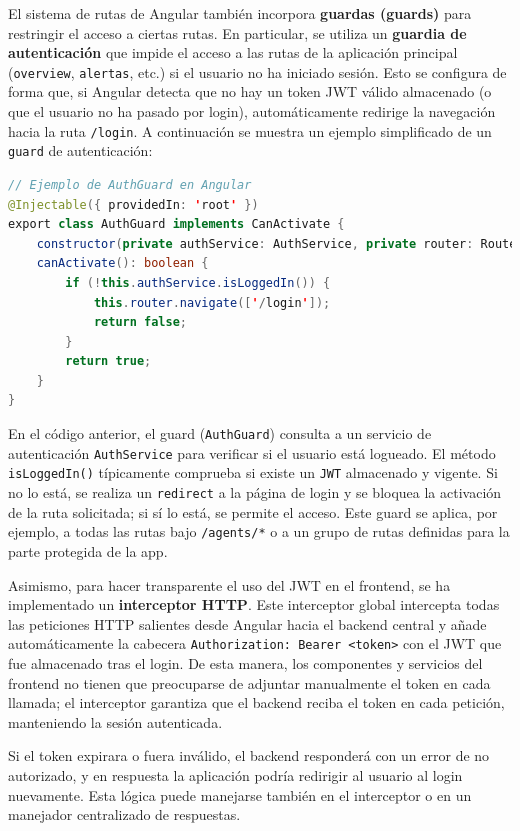 \documentclass[11pt,a4paper,twoside]{report}
\begin{document}
El sistema de rutas de Angular también incorpora \textbf{guardas (guards)} para restringir el acceso a ciertas rutas. En particular, se utiliza un \textbf{guardia de autenticación} que impide el acceso a las rutas de la aplicación principal (\texttt{overview}, \texttt{alertas}, etc.) si el usuario no ha iniciado sesión. Esto se configura de forma que, si Angular detecta que no hay un token JWT válido almacenado (o que el usuario no ha pasado por login), automáticamente redirige la navegación hacia la ruta \texttt{/login}. A continuación se muestra un ejemplo simplificado de un \texttt{guard} de autenticación:

\begin{lstlisting}[language=Java, caption={Ejemplo simplificado de authGuard}, label={lst:authGuard}]
// Ejemplo de AuthGuard en Angular
@Injectable({ providedIn: 'root' })
export class AuthGuard implements CanActivate {
	constructor(private authService: AuthService, private router: Router) {}
	canActivate(): boolean {
		if (!this.authService.isLoggedIn()) {
			this.router.navigate(['/login']);
			return false;
		}
		return true;
	}
}

\end{lstlisting}

En el código anterior, el guard (\texttt{AuthGuard}) consulta a un servicio de autenticación \texttt{AuthService} para verificar si el usuario está logueado. El método \texttt{isLoggedIn()} típicamente comprueba si existe un \texttt{JWT} almacenado y vigente. Si no lo está, se realiza un \texttt{redirect} a la página de login y se bloquea la activación de la ruta solicitada; si sí lo está, se permite el acceso. Este guard se aplica, por ejemplo, a todas las rutas bajo \texttt{/agents/*} o a un grupo de rutas definidas para la parte protegida de la app.\newline

Asimismo, para hacer transparente el uso del JWT en el frontend, se ha implementado un \textbf{interceptor HTTP}. Este interceptor global intercepta todas las peticiones HTTP salientes desde Angular hacia el backend central y añade automáticamente la cabecera \texttt{Authorization: Bearer <token>} con el JWT que fue almacenado tras el login. De esta manera, los componentes y servicios del frontend no tienen que preocuparse de adjuntar manualmente el token en cada llamada; el interceptor garantiza que el backend reciba el token en cada petición, manteniendo la sesión autenticada.\newline

Si el token expirara o fuera inválido, el backend responderá con un error de no autorizado, y en respuesta la aplicación podría redirigir al usuario al login nuevamente. Esta lógica puede manejarse también en el interceptor o en un manejador centralizado de respuestas.
\end{document}
